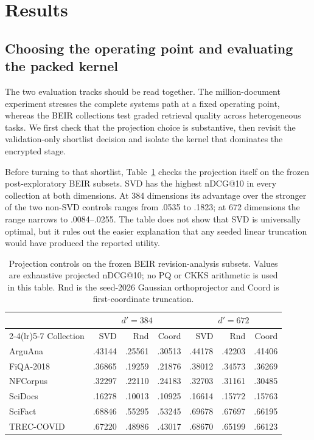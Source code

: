 \documentclass[pdflatex,sn-basic,Numbered]{sn-jnl}
\theoremstyle{plain}
\begin{document}
\section{Results}\label{sec:evaluation}

\subsection{Choosing the operating point and evaluating the packed kernel}\label{subsec:validation-selection}

The two evaluation tracks should be read together. The million-document experiment stresses the complete systems path at a fixed operating point, whereas the BEIR collections test graded retrieval quality across heterogeneous tasks. We first check that the projection choice is substantive, then revisit the validation-only shortlist decision and isolate the kernel that dominates the encrypted stage.

Before turning to that shortlist, Table~\ref{tab:projection-controls} checks the projection itself on the frozen post-exploratory BEIR subsets. SVD has the highest nDCG@10 in every collection at both dimensions. At 384 dimensions its advantage over the stronger of the two non-SVD controls ranges from .0535 to .1823; at 672 dimensions the range narrows to .0084--.0255. The table does not show that SVD is universally optimal, but it rules out the easier explanation that any seeded linear truncation would have produced the reported utility.

\begin{table}[t]
\caption{Projection controls on the frozen BEIR revision-analysis subsets. Values are exhaustive projected nDCG@10; no PQ or CKKS arithmetic is used in this table. Rnd is the seed-2026 Gaussian orthoprojector and Coord is first-coordinate truncation.}\label{tab:projection-controls}
\centering
\small
\begin{tabular}{@{}lrrrrrr@{}}
\toprule
& \multicolumn{3}{c}{$d'=384$} & \multicolumn{3}{c}{$d'=672$} \\
\cmidrule(lr){2-4}\cmidrule(lr){5-7}
Collection & SVD & Rnd & Coord & SVD & Rnd & Coord \\
\midrule
ArguAna & .43144 & .25561 & .30513 & .44178 & .42203 & .41406 \\
FiQA-2018 & .36865 & .19259 & .21876 & .38012 & .34573 & .36269 \\
NFCorpus & .32297 & .22110 & .24183 & .32703 & .31161 & .30485 \\
SciDocs & .16278 & .10013 & .10925 & .16614 & .15772 & .15763 \\
SciFact & .68846 & .55295 & .53245 & .69678 & .67697 & .66195 \\
TREC-COVID & .67220 & .48986 & .43017 & .68670 & .65199 & .66123 \\
\bottomrule
\end{tabular}
\end{table}
\end{document}
